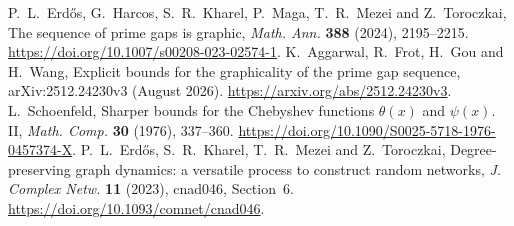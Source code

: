 P.~L.~Erd\H{o}s, G.~Harcos, S.~R.~Kharel, P.~Maga,
T.~R.~Mezei and Z.~Toroczkai, The sequence of prime gaps is graphic,
\emph{Math. Ann.} \textbf{388} (2024), 2195--2215.
\url{https://doi.org/10.1007/s00208-023-02574-1}.
 K.~Aggarwal, R.~Frot, H.~Gou and H.~Wang,
Explicit bounds for the graphicality of the prime gap sequence,
arXiv:2512.24230v3 (August 2026).
\url{https://arxiv.org/abs/2512.24230v3}.
 L.~Schoenfeld, Sharper bounds for the Chebyshev functions
$\theta(x)$ and $\psi(x)$. II, \emph{Math. Comp.} \textbf{30} (1976), 337--360.
\url{https://doi.org/10.1090/S0025-5718-1976-0457374-X}.
 P.~L.~Erd\H{o}s, S.~R.~Kharel, T.~R.~Mezei and
Z.~Toroczkai, Degree-preserving graph dynamics: a versatile process to
construct random networks, \emph{J. Complex Netw.} \textbf{11} (2023),
cnad046, Section~6. \url{https://doi.org/10.1093/comnet/cnad046}.
